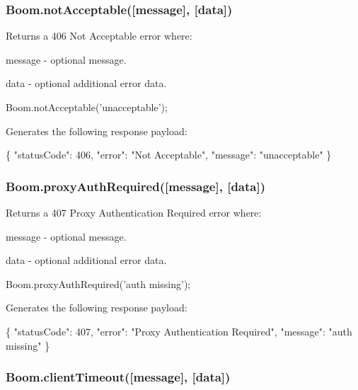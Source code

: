 \subsubsection*{{\ttfamily Boom.\+not\+Acceptable(\mbox{[}message\mbox{]}, \mbox{[}data\mbox{]})}}

Returns a 406 Not Acceptable error where\+:
\begin{DoxyItemize}
\item {\ttfamily message} -\/ optional message.
\item {\ttfamily data} -\/ optional additional error data.
\end{DoxyItemize}


\begin{DoxyCode}
Boom.notAcceptable('unacceptable');
\end{DoxyCode}


Generates the following response payload\+:


\begin{DoxyCode}
\{
    "statusCode": 406,
    "error": "Not Acceptable",
    "message": "unacceptable"
\}
\end{DoxyCode}


\subsubsection*{{\ttfamily Boom.\+proxy\+Auth\+Required(\mbox{[}message\mbox{]}, \mbox{[}data\mbox{]})}}

Returns a 407 Proxy Authentication Required error where\+:
\begin{DoxyItemize}
\item {\ttfamily message} -\/ optional message.
\item {\ttfamily data} -\/ optional additional error data.
\end{DoxyItemize}


\begin{DoxyCode}
Boom.proxyAuthRequired('auth missing');
\end{DoxyCode}


Generates the following response payload\+:


\begin{DoxyCode}
\{
    "statusCode": 407,
    "error": "Proxy Authentication Required",
    "message": "auth missing"
\}
\end{DoxyCode}


\subsubsection*{{\ttfamily Boom.\+client\+Timeout(\mbox{[}message\mbox{]}, \mbox{[}data\mbox{]})}}

